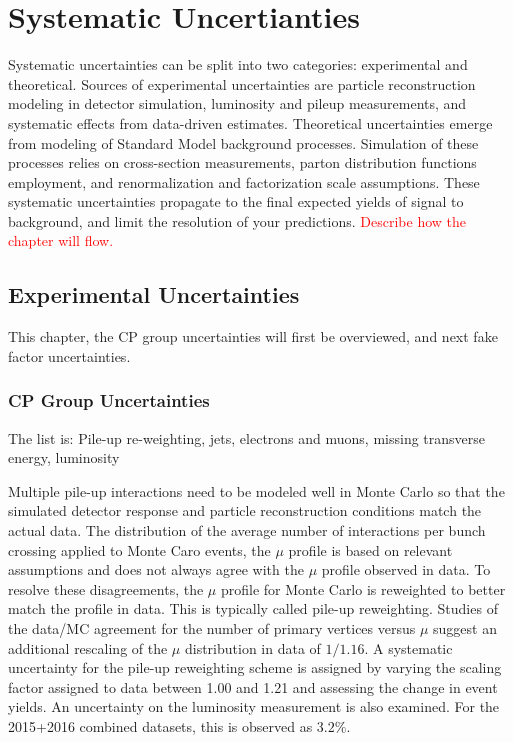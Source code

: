 \chapter{Systematic Uncertianties}
\label{sec:syst}
Systematic uncertainties can be split into two categories: experimental and theoretical.  Sources of experimental uncertainties are particle reconstruction modeling in detector simulation, luminosity and pileup measurements, and systematic effects from data-driven estimates.  Theoretical uncertainties emerge from modeling of Standard Model background processes.  Simulation of these processes relies on cross-section measurements, parton distribution functions employment, and renormalization and factorization scale assumptions. These systematic uncertainties propagate to the final expected yields of signal to background, and limit the resolution of your predictions. \textcolor{red}{Describe how the chapter will flow.}

\section{Experimental Uncertainties}
\label{sec:sys:texp}
This chapter, the CP group uncertainties will first be overviewed, and next fake factor uncertainties.  
\subsection{CP Group Uncertainties}
The list is: Pile-up re-weighting, jets, electrons and muons, missing transverse energy, luminosity

Multiple pile-up interactions need to be modeled well in Monte Carlo so that the simulated detector response and particle reconstruction conditions match the actual data.  The distribution of the average number of interactions per bunch crossing applied to Monte Caro events, the $\mu$ profile is based on relevant assumptions and does not always agree with the $\mu$ profile observed in data.  To resolve these disagreements, the $\mu$ profile for Monte Carlo is reweighted to better match the profile in data.  This is typically called pile-up reweighting.  Studies of the data/MC agreement for the number of primary vertices versus $\mu$ suggest an additional rescaling of the $\mu$ distribution in data of $1/1.16$.  A systematic uncertainty for the pile-up reweighting scheme is assigned by varying the scaling factor assigned to data between 1.00 and 1.21 and assessing the change in event yields.  An uncertainty on the luminosity measurement is also examined.  For the 2015+2016 combined datasets, this is observed as $3.2\%$.

